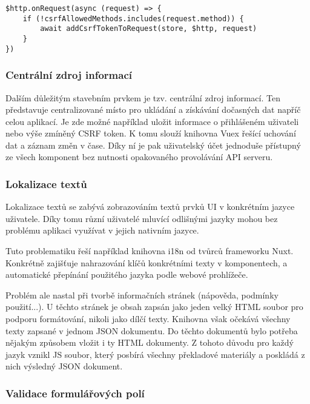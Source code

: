 		\begin{lstlisting}[caption={Ukázka vložení CSRF tokenu do každého požadavku putujícího na API server. Zdroj: [autor]}]
$http.onRequest(async (request) => {
	if (!csrfAllowedMethods.includes(request.method)) {
		await addCsrfTokenToRequest(store, $http, request)
	}
})
		\end{lstlisting}

		\subsubsection{Centrální zdroj informací}

		Dalším důležitým stavebním prvkem je tzv. centrální zdroj informací.
		Ten představuje centralizované místo pro ukládání a získávání dočasných dat napříč celou aplikací.
		Je zde možné například uložit informace o přihlášeném uživateli nebo výše zmíněný \ac{CSRF} token.
		K tomu slouží knihovna Vuex řešící uchování dat a záznam změn v čase.
		Díky ní je pak uživatelský účet jednoduše přístupný ze všech komponent bez nutnosti opakovaného provolávání
		\ac{API} serveru.

		\subsubsection{Lokalizace textů}

		Lokalizace textů se zabývá zobrazováním textů prvků \ac{UI} v konkrétním jazyce uživatele.
		Díky tomu různí uživatelé mluvící odlišnými jazyky mohou bez problému aplikaci využívat v jejich nativním jazyce.

		Tuto problematiku řeší například knihovna i18n od tvůrců frameworku Nuxt.
		Konkrétně zajišťuje nahrazování klíčů konkrétními texty v komponentech, a automatické přepínání použitého jazyka
		podle webové prohlížeče.

		Problém ale nastal při tvorbě informačních stránek (nápověda, podmínky použití...).
		U těchto stránek je obsah zapsán jako jeden velký \ac{HTML} soubor pro podporu formátování, nikoli
		jako dílčí texty.
		Knihovna však očekává všechny texty zapsané v jednom \ac{JSON} dokumentu.
		Do těchto dokumentů bylo potřeba nějakým způsobem vložit i ty \ac{HTML} dokumenty.
		Z tohoto důvodu pro každý jazyk vznikl \ac{JS} soubor, který posbírá všechny překladové materiály a poskládá z nich
		výsledný \ac{JSON} dokument.

		\subsubsection{Validace formulářových polí}

